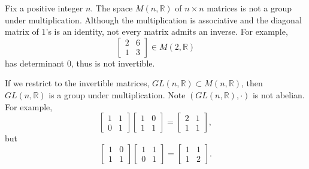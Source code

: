 \documentclass{amsart}
\begin{document}
\begin{example}\label{matrices}
   Fix a positive integer \(n\). The space \(M(n, \mathbb{R})\) of \(n\times
	n\) matrices is not a group under multiplication. Although the
	multiplication is associative and the diagonal matrix of \(1\)'s is an
	identity, not every matrix admits an inverse. For example, 
	\[
	   \begin{bmatrix}
			2 & 6\\
			1 & 3
	   \end{bmatrix}\in M(2, \mathbb{R})
	\]
	has determinant \(0\), thus is not invertible.

	If we restrict to the invertible matrices, \(GL(n, \mathbb{R})\subset M(n,
	\mathbb{R})\), then \(GL(n, \mathbb{R})\) is a group under multiplication.
	Note \((GL(n, \mathbb{R}), \cdot)\) is not abelian. For example, 
	\[
		\begin{bmatrix}
			1 & 1\\
			0 & 1
		\end{bmatrix} 
		\begin{bmatrix}
			1 & 0\\
			1 & 1
		\end{bmatrix}
		= 
		\begin{bmatrix}
			2 & 1\\
			1 & 1
		\end{bmatrix},
	\]
	but 
	\[
	   \begin{bmatrix}
			1 & 0\\
			1 & 1
	   \end{bmatrix}
		\begin{bmatrix}
			1 & 1\\
			0 & 1
		\end{bmatrix}
		= 
		\begin{bmatrix}
			1 & 1\\
			1 & 2
		\end{bmatrix}.
	\]
\end{example}
\end{document}
